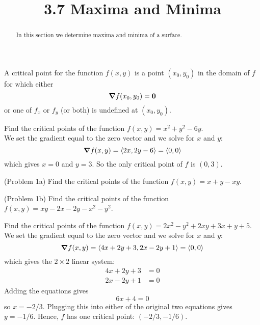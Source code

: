 \documentclass[handout]{ximera}
\title{3.7 Maxima and Minima}
\begin{document}
\begin{abstract}
In this section we determine maxima and minima of a surface.
\end{abstract}

\maketitle

\begin{definition}
A critical point for the function $f(x,y)$ is a point $(x_0, y_0)$ in the domain of $f$ for which either
\[
\boldsymbol\nabla f(x_0, y_0) = \mathbf 0
\]
or one of $f_x$ or $f_y$ (or both) is undefined at $(x_0, y_0)$.
\end{definition}

\begin{example}[Example 1]
Find the critical points of the function $f(x,y) = x^2 + y^2 - 6y$.\\
We set the gradient equal to the zero vector and we solve for $x$ and $y$:
\[
\boldsymbol\nabla f(x,y) = \left\langle 2x, 2y -6\right\rangle = \left\langle 0,0\right\rangle
\]
which gives $x = 0$ and $y = 3$.  So the only critical point of $f$ is $(0,3)$.
\end{example}

\begin{problem}(Problem 1a)
Find the critical points of the function $f(x,y) = x+ y - xy$.
\end{problem}


\begin{problem}(Problem 1b)
Find the critical points of the function $f(x,y) = xy - 2x-2y-x^2 - y^2$.
\end{problem}

\begin{example}[Example 2]
Find the critical points of the function $f(x,y) = 2x^2 - y^2 +2xy + 3x + y+ 5$.\\
We set the gradient equal to the zero vector and we solve for $x$ and $y$:
\[
\boldsymbol\nabla f(x,y) = \left\langle 4x+2y + 3, 2x - 2y + 1\right\rangle = \left\langle 0,0\right\rangle
\]
which gives the $2 \times 2$ linear system:
\begin{align*}
4x+2y + 3 &= 0\\
2x -2y + 1 & = 0
\end{align*}
Adding the equations gives 
\[
6x + 4 = 0
\]
so $x = -2/3$. Plugging this into either of the original two equations gives $y = -1/6$.
Hence, $f$ has one critical point: $(-2/3, -1/6)$.
\end{example}
\end{document}
